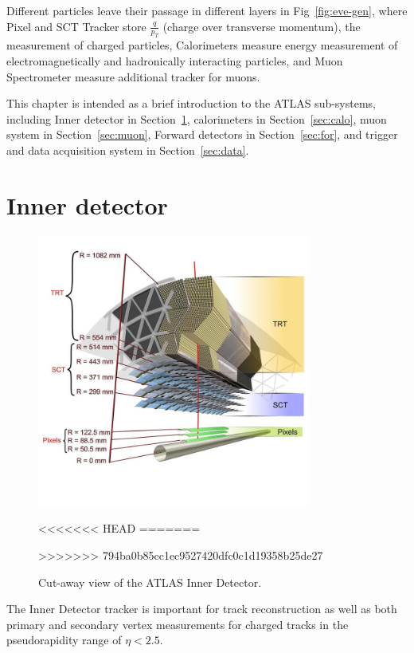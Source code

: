 \par Different particles leave their passage in different layers in Fig~\ref{fig:eve-gen}, where Pixel and SCT Tracker store $\frac{q}{p_T}$ (charge over transverse momentum), the measurement of charged particles, Calorimeters measure energy measurement of electromagnetically and hadronically interacting particles, and Muon Spectrometer measure additional tracker for muons.		 	 	 		
\par This chapter is intended as a brief introduction to the ATLAS sub-systems,
 including Inner detector in Section~\ref{sec:inner}, calorimeters in Section~\ref{sec:calo}, 
muon system in Section~\ref{sec:muon}, Forward detectors in Section~\ref{sec:for}, and trigger and data acquisition system in Section~\ref{sec:data}.


\section{Inner detector}
\label{sec:inner}
\begin{figure}[htbp]
 \begin{center}
 \includegraphics[width=0.8\textwidth]{chapters/c4/figures/inner}
 \end{center}
 \caption{Cut-away view of the ATLAS Inner Detector.}
<<<<<<< HEAD
=======

>>>>>>> 794ba0b85cc1ec9527420dfc0c1d19358b25de27
 \label{fig:inner}
\end{figure}
\par The Inner Detector tracker is important for track reconstruction as well as both primary and secondary vertex measurements for charged tracks in the pseudorapidity range of $ \eta< 2.5$. 
